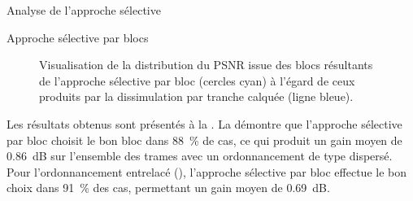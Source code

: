 \begin{section}{Analyse de l'approche sélective}
\begin{subsection}{Approche sélective par blocs}
\begin{figure}
	\caption[PSNR issu des blocs résultants de l'approche sélective par bloc] 
	{Visualisation de la distribution du PSNR issue des blocs résultants de
l'approche sélective par bloc (cercles cyan) à l'égard de ceux produits par la
dissimulation par tranche calquée (ligne bleue).}
	\label{fig-SelectiveSliceCopyBlocks}
\end{figure}

Les résultats obtenus sont présentés à la . La
 démontre que l'approche sélective par
bloc choisit le bon bloc dans 88~\% de cas, ce qui produit un gain moyen de
0.86~dB sur l'ensemble des trames avec un ordonnancement de type dispersé. Pour
l'ordonnancement entrelacé (),
l'approche sélective par bloc effectue le bon choix dans 91~\% des cas,
permettant un gain moyen de 0.69~dB.


\end{subsection}
\end{section}
